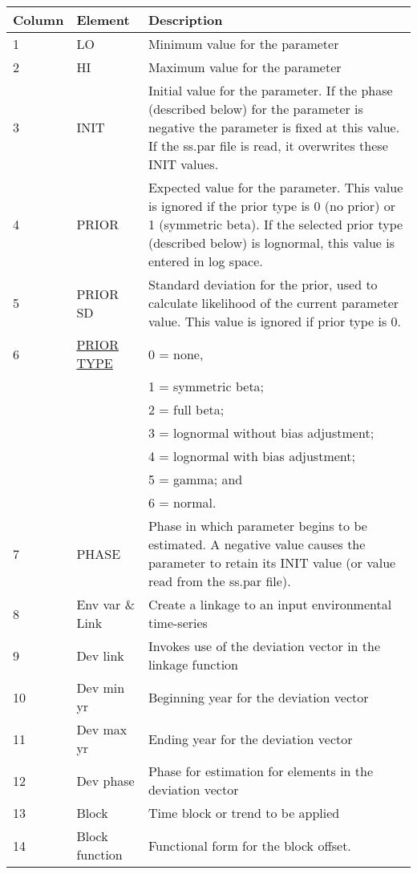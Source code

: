 \hypertarget{Priors}{} \hypertarget{paraOrder}{}
\begin{center}
	\begin{tabular}{p{2cm} p{3cm} p{10cm}}
		\hline
		Column & Element & Description \Tstrut\Bstrut\\
		\hline
		1 & LO & Minimum value for the parameter\Tstrut\\
		2 & HI & Maximum value for the parameter\Tstrut\\
		3 \Tstrut & INIT & Initial value for the parameter. If the phase (described below) for the parameter is negative the parameter is fixed at this value. If the ss.par file is read, it overwrites these INIT values.\\
		4 \Tstrut & PRIOR & Expected value for the parameter.  This value is ignored if the prior type is 0 (no prior) or 1 (symmetric beta). If the selected prior type (described below) is lognormal, this value is entered in log space. \\
		5 \Tstrut & PRIOR SD & Standard deviation for the prior, used to calculate likelihood of the current parameter value. This value is ignored if prior type is 0.\\
		6 \Tstrut & \hyperlink{PriorDescrip}{PRIOR TYPE}  & 0 = none, \\
		& & 1 = symmetric beta; \\
		& & 2 = full beta; \\
		& & 3 = lognormal without bias adjustment; \\
		& & 4 = lognormal with bias adjustment; \\
		& & 5 = gamma; and \\
		& & 6 = normal. \\
		7 \Tstrut & PHASE & Phase in which parameter begins to be estimated.  A negative value causes the parameter to retain its INIT value (or value read from the ss.par file).\Bstrut\\
		8  \Tstrut & Env var \& Link & Create a linkage to an input environmental time-series\\
		9  \Tstrut & Dev link & Invokes use of the deviation vector in the linkage function \\
		10 \Tstrut & Dev min yr & Beginning year for the deviation vector \\
		11 \Tstrut & Dev max yr & Ending year for the deviation vector\\
		12 \Tstrut & Dev phase & Phase for estimation for elements in the deviation vector \\
		13 \Tstrut & Block & Time block or trend to be applied \\
		14 \Tstrut & Block function & Functional form for the block offset. \Bstrut\\
		\hline
	\end{tabular}
\end{center}

